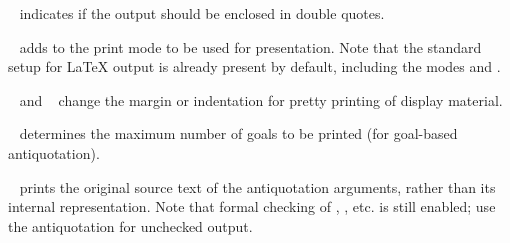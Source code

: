 \begin{isabellebody}
\begin{isamarkuptext}
\begin{description}
  \item {}\hypertarget{antiquotation option.quotes}{\hyperlink{antiquotation option.quotes}{\mbox{}}}~ indicates
  if the output should be enclosed in double quotes.

  \item {}\hypertarget{antiquotation option.mode}{\hyperlink{antiquotation option.mode}{\mbox{}}}~ adds  to the print mode to be used for presentation.  Note that the
  standard setup for {\LaTeX} output is already present by default,
  including the modes  and .

  \item {}\hypertarget{antiquotation option.margin}{\hyperlink{antiquotation option.margin}{\mbox{}}}~ and
  \hypertarget{antiquotation option.indent}{\hyperlink{antiquotation option.indent}{\mbox{}}}~ change the margin
  or indentation for pretty printing of display material.

  \item {}\hypertarget{antiquotation option.goals-limit}{\hyperlink{antiquotation option.goals-limit}{\mbox{}}}~
  determines the maximum number of goals to be printed (for goal-based
  antiquotation).

  \item {}\hypertarget{antiquotation option.source}{\hyperlink{antiquotation option.source}{\mbox{}}}~ prints the
  original source text of the antiquotation arguments, rather than its
  internal representation.  Note that formal checking of
  \hyperlink{antiquotation.thm}{\mbox{}}, \hyperlink{antiquotation.term}{\mbox{}}, etc. is still
  enabled; use the \hyperlink{antiquotation.text}{\mbox{}} antiquotation for unchecked
  output.


\end{description}
\end{isamarkuptext}
\end{isabellebody}
